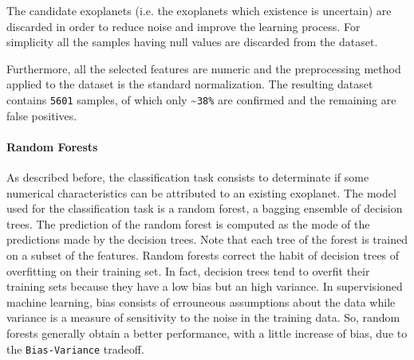 \documentclass[11pt, a4paper]{article}
\begin{document}
    The candidate exoplanets (i.e. the exoplanets which existence is uncertain) are discarded in order to reduce noise and improve the learning process.
    For simplicity all the samples having null values are discarded from the dataset.

    Furthermore, all the selected features are numeric and the preprocessing method applied to the dataset is the standard normalization.
    The resulting dataset contains \texttt{5601} samples, of which only \textasciitilde \texttt{38\%} are confirmed and the remaining are false positives.
    
  \paragraph{Random Forests}
    As described before, the classification task consists to determinate if some numerical characteristics can be attributed to an existing exoplanet.
    The model used for the classification task is a random forest, a bagging ensemble of decision trees.
    The prediction of the random forest is computed as the mode of the predictions made by the decision trees.
    Note that each tree of the forest is trained on a subset of the features.
    Random forests correct the habit of decision trees of overfitting on their training set.
    In fact, decision trees tend to overfit their training sets because they have a low bias but an high variance.
    In supervisioned machine learning, bias consists of errouneous assumptions about the data while variance is a measure of sensitivity to the noise in the training data.
    So, random forests generally obtain a better performance, with a little increase of bias, due to the \texttt{Bias-Variance} tradeoff.
    
\end{document}
